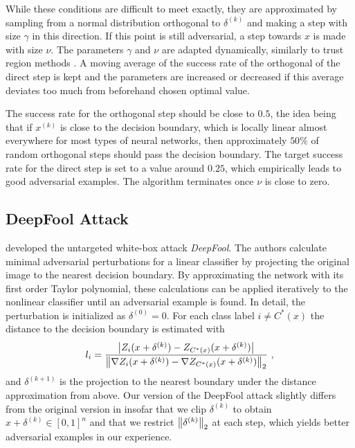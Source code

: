 While these conditions are difficult to meet exactly, they are approximated by sampling from a normal distribution orthogonal to $\delta^{(k)}$ and making a step with size $\gamma$ in this direction.
If this point is still adversarial, a step towards $x$ is made with size $\nu$.
The parameters $\gamma$ and $\nu$ are adapted dynamically, similarly to trust region methods \citep{trustregion}.
A moving average of the success rate of the orthogonal of the direct step is kept and the parameters are increased or decreased if this average deviates too much from beforehand chosen optimal value.

The success rate for the orthogonal step should be close to $0.5$, the idea being that if $x^{(k)}$ is close to the decision boundary, which is locally linear almost everywhere for most types of neural networks, then approximately $50\%$ of random orthogonal steps should pass the decision boundary. 
The target success rate for the direct step is set to a value around $0.25$, which empirically leads to good adversarial examples.
The algorithm terminates once $\nu$ is close to zero.

\subsection{DeepFool Attack}

\citet{deepfool} developed the untargeted white-box attack \emph{DeepFool}.
The authors calculate minimal adversarial perturbations for a linear classifier by projecting the original image to the nearest decision boundary.
By approximating the network with its first order Taylor polynomial, these calculations can be applied iteratively to the nonlinear classifier until an adversarial example is found.
In detail, the perturbation is initialized as $\delta^{(0)} = 0$.
For each class label $i \neq C^*(x)$ the distance to the decision boundary is estimated with
\begin{equation}
l_i = 
\frac{
	\left \lvert Z_i(x + \delta^{(k)}) - Z_{C^*(x)}(x + \delta^{(k)}) \right \rvert
}
{
	\left \lVert \nabla Z_i(x + \delta^{(k)}) - \nabla Z_{C^*(x)}(x + \delta^{(k)}) \right \rVert _{2}
}
\text{ ,}
\end{equation}
and $\delta^{(k+1)}$ is the projection to the nearest boundary under the distance approximation from above.
Our version of the DeepFool attack slightly differs from the original version in insofar that we clip $\delta^{(k)}$ to obtain $x + \delta^{(k)} \in [0,1]^n$ and that we restrict $\left \lVert \delta^{(k)} \right \rVert _{2}$ at each step, which yields better adversarial examples in our experience.

